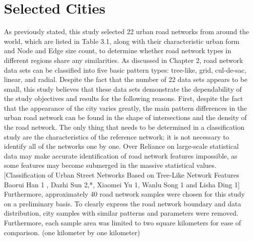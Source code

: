 \section{Selected Cities}
As previously stated, this study selected 22 urban road networks from around the world, which are listed in Table 3.1, along with their characteristic urban form and Node and Edge size count, to determine whether road network types in different regions share any similarities. As discussed in Chapter 2, road network data sets can be classified into five basic pattern types: tree-like, grid, cul-de-sac, linear, and radial. Despite the fact that the number of 22 data sets appears to be small, this study believes that these data sets demonstrate the dependability of the study objectives and results for the following reasons. First, despite the fact that the appearance of the city varies greatly, the main pattern differences in the urban road network can be found in the shape of intersections and the density of the road network. The only thing that needs to be determined in a classification study are the characteristics of the reference network; it is not necessary to identify all of the networks one by one. Over Reliance on large-scale statistical data may make accurate identification of road network features impossible, as some features may become submerged in the massive statistical values. [Classification of Urban Street Networks Based on Tree-Like Network Features Baorui Han 1 , Dazhi Sun 2,*, Xiaomei Yu 1, Wanlu Song 1 and Lisha Ding 1] Furthermore, approximately 40 road network samples were chosen for this study on a preliminary basis. To clearly express the road network boundary and data distribution, city samples with similar patterns and parameters were removed.
Furthermore, each sample area was limited to two square kilometers for ease of comparison. (one kilometer by one kilometer)


